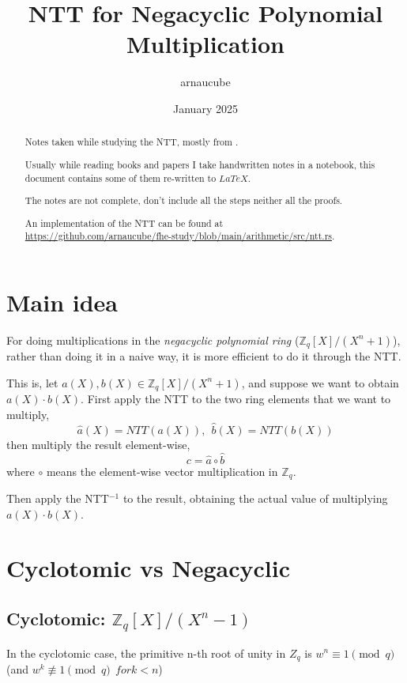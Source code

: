 \documentclass{article}
\title{NTT for Negacyclic Polynomial Multiplication}
\author{arnaucube}
\date{January 2025}
\newcommand{\Zq}{\mathbb{Z}_q}
\newcommand{\Rq}{\mathbb{Z}_q[X]/(X^n+1)}
\begin{document}
\maketitle

\begin{abstract}
    Notes taken while studying the NTT, mostly from \cite{10177902}.

	Usually while reading books and papers I take handwritten notes in a notebook, this document contains some of them re-written to $LaTeX$.

	The notes are not complete, don't include all the steps neither all the proofs.

	An implementation of the NTT can be found at\\
	\href{https://github.com/arnaucube/fhe-study/blob/main/arithmetic/src/ntt.rs}{https://github.com/arnaucube/fhe-study/blob/main/arithmetic/src/ntt.rs}.
\end{abstract}

\tableofcontents

\section{Main idea}
For doing multiplications in the \emph{negacyclic polynomial ring} ($\Rq$), rather than doing it in a naive way, it is more
efficient to do it through the NTT.

This is, let $a(X), b(X) \in \Rq$, and suppose we want to
obtain $a(X) \cdot b(X)$. First apply the NTT to the two ring
elements that we want to multiply,
$$\hat{a}(X) = NTT(a(X)),~~ \hat{b}(X)=NTT(b(X))$$
then multiply the result element-wise,
$$c= \hat{a} \circ \hat{b}$$
where $\circ$ means the element-wise vector multiplication in $\Zq$.

Then apply the NTT$^{-1}$ to the result, obtaining the actual value of
multiplying $a(X) \cdot b(X)$.

\section{Cyclotomic vs Negacyclic}

\subsection{Cyclotomic: \texorpdfstring{$\mathbb{Z}_q[X]/(X^n-1)$}{Zq[X]/(X**n-1)}}
In the cyclotomic case, the primitive n-th root of unity in $Z_q$ is $w^n \equiv 1 \pmod q$ (and
$w^k \not\equiv 1 \pmod q ~~ for k<n$)
\end{document}

